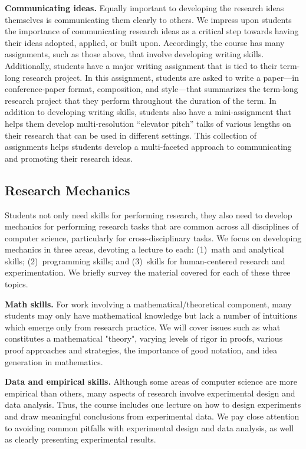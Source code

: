 \vspace*{0.1in}
\noindent
{\bf Communicating ideas.}  Equally important to developing the research
ideas themselves is communicating them clearly to others.  We impress
upon students the importance of communicating research ideas as a
critical step towards having their ideas adopted, applied, or built
upon.  Accordingly, the course has many assignments, such as those
above, that involve developing writing skills.  Additionally, students
have a major writing assignment that is tied to their term-long research
project.  In this assignment, students are asked to write a paper---in
conference-paper format, composition, and style---that summarizes the
term-long research project that they perform throughout the duration of
the term.  In addition to developing writing skills, students also have
a mini-assignment that helps them develop multi-resolution ``elevator
pitch'' talks of various lengths on their research that can be used in
different settings.  This collection of assignments helps students
develop a multi-faceted approach to communicating and promoting their
research ideas.  



\subsection{Research Mechanics}

Students not only need skills for performing research, they also need to
develop mechanics for performing research tasks that are common across
all disciplines of computer science, particularly for cross-disciplinary
tasks.  We focus on developing mechanics in three areas, devoting a
lecture to each: (1)~math and analytical skills; (2)~programming skills;
and (3)~skills for human-centered research and experimentation.  We
briefly survey the material covered for each of these three topics.

\vspace*{0.1in}
\noindent
{\bf Math skills.} For work involving a mathematical/theoretical
component, many students may only have mathematical knowledge but lack a
number of intuitions which emerge only from research practice.  We will
cover issues such as what constitutes a mathematical "theory", varying
levels of rigor in proofs, various proof approaches and strategies, the
importance of good notation, and idea generation in mathematics.

\vspace*{0.1in}
\noindent
{\bf Data and empirical skills.}  Although some areas of computer
science are more empirical than others, many aspects of research involve
experimental design and data analysis.  Thus, the course includes one
lecture on how to design experiments and draw meaningful conclusions
from experimental data.  We pay close attention to avoiding common
pitfalls with experimental design and data analysis, as well as
clearly presenting experimental results.

